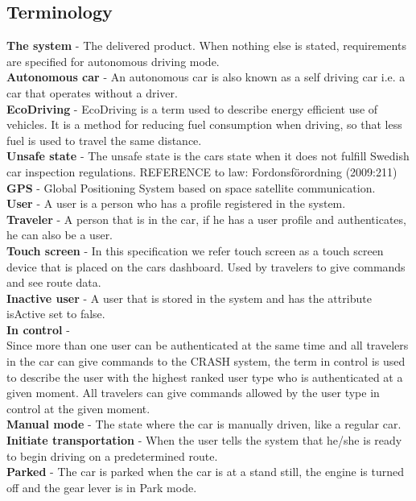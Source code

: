 \documentclass{article}
\begin{document}
\subsection{Terminology}
\textbf{The system} - The delivered product. When nothing else is stated, requirements are specified for autonomous driving mode.\\
\textbf{Autonomous car} - An autonomous car is also known as a self driving car i.e. a car that operates without a driver. \\
\textbf{EcoDriving} - EcoDriving is a term used to describe energy efficient use of vehicles. It is a method for reducing fuel consumption when driving, so that less fuel is used to travel the same distance.\\
\textbf{Unsafe state} - The unsafe state is the cars state when it does not fulfill Swedish car inspection regulations.
REFERENCE to law: Fordonsförordning (2009:211) \\
\textbf{GPS} - Global Positioning System based on space satellite communication.\\
\textbf{User} - A user is a person who has a profile registered in the system. \\
\textbf{Traveler} - A person that is in the car, if he has a user profile and authenticates, he can also be a user. \\
\textbf{Touch screen} - In this specification we refer touch screen as a touch screen device that is placed on the cars dashboard. Used by travelers to  give commands and see route data. \\
\textbf{Inactive user} - A user that is stored in the system and has the attribute isActive set to false. \\
\textbf{In control} - \\ Since more than one user can be authenticated at the same time and all travelers in the car can give commands to the CRASH system, the term in control is used to describe the user with the highest ranked user type who is authenticated at a given moment. All travelers can give commands allowed by the user type in control at the given moment.\\
\textbf{Manual mode} - The state where the car is manually driven, like a regular car.\\
\textbf{Initiate transportation} - When the user tells the system that he/she is ready to begin driving on a predetermined route. \\
\textbf{Parked} - The car is parked when the car is at a stand still, the engine is turned off and the gear lever is in Park mode.  \\
\end{document}
